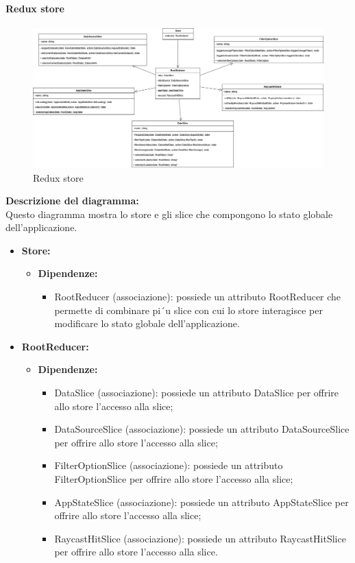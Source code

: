 \paragraph{Redux store}
\begin{figure}[h!] \centering
    \includegraphics[scale=0.3]{template/images/uml_front/logic/store.png}
    \caption{Redux store}
\end{figure}
\textbf{Descrizione del diagramma:}\\
Questo diagramma mostra lo store e gli slice che compongono lo stato globale dell'applicazione.
\begin{itemize}
    \item \textbf{Store:}
    \begin{itemize}
        \item \textbf{Dipendenze:}
        \begin{itemize}
            \item RootReducer (associazione): possiede un attributo RootReducer che permette di combinare pi´u slice
            con cui lo store interagisce per modificare lo stato globale dell’applicazione.
        \end{itemize}  
    \end{itemize}

    \item \textbf{RootReducer:}
    \begin{itemize}
        \item \textbf{Dipendenze:}
        \begin{itemize}
            \item DataSlice (associazione): possiede un attributo DataSlice per offrire allo store l’accesso alla slice;
            \item DataSourceSlice (associazione): possiede un attributo DataSourceSlice per offrire allo store l’accesso alla slice;
            \item FilterOptionSlice (associazione): possiede un attributo FilterOptionSlice per offrire allo store l’accesso alla slice;
            \item AppStateSlice (associazione): possiede un attributo AppStateSlice per offrire allo store l’accesso alla slice;
            \item RaycastHitSlice (associazione): possiede un attributo RaycastHitSlice per offrire allo store l’accesso alla slice.
        \end{itemize}  
    \end{itemize}
\end{itemize}



